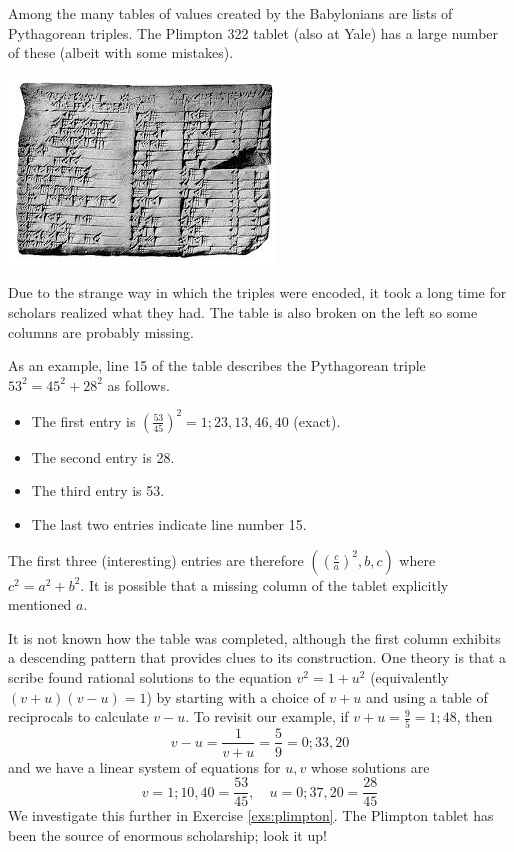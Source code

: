 \vfil\goodbreak




Among the many tables of values created by the Babylonians are lists of Pythagorean triples. The Plimpton 322 tablet (also at Yale) has a large number of these (albeit with some mistakes).
\begin{center}
\includegraphics{plimpton322.jpg}
\end{center}
Due to the strange way in which the triples were encoded, it took a long time for scholars realized what they had. The table is also broken on the left so some columns are probably missing. %
\goodbreak

As an example, line 15 of the table describes the Pythagorean triple $53^2=45^2+28^2$ as follows.
\begin{itemize}
  \item The first entry is $(\frac{53}{45})^2=1;23,13,46,40$ (exact).
  \item The second entry is 28.
  \item The third entry is 53.
  \item The last two entries indicate line number 15.
\end{itemize}
The first three (interesting) entries are therefore $((\frac ca)^2,b,c)$ where $c^2=a^2+b^2$. It is possible that a missing column of the tablet explicitly mentioned $a$.\smallbreak 

It is not known how the table was completed, although the first column exhibits a descending pattern that provides clues to its construction. One theory is that a scribe found rational solutions to the equation $v^2=1+u^2$ (equivalently $(v+u)(v-u)=1$) by starting with a choice of $v+u$ and using a table of reciprocals to calculate $v-u$.\smallbreak
To revisit our example, if $v+u=\frac 95=1;48$, then
\[v-u=\frac 1{v+u}=\frac 59=0;33,20\]
and we have a linear system of equations for $u,v$ whose solutions are
\[v=1;10,40=\frac{53}{45},\quad u=0;37,20=\frac{28}{45}\]
We investigate this further in Exercise \ref{exs:plimpton}. The Plimpton tablet has been the source of enormous scholarship; look it up!


